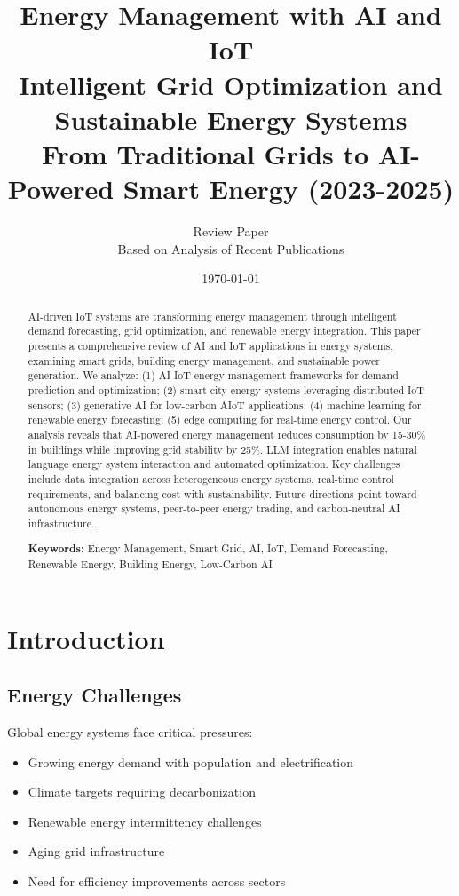 \documentclass[12pt,a4paper]{article}
\title{
\vspace{-1cm}
{\Huge\bfseries Energy Management with AI and IoT}\\[0.5cm]
{\Large Intelligent Grid Optimization and Sustainable Energy Systems}\\[0.3cm]
{\large From Traditional Grids to AI-Powered Smart Energy (2023-2025)}
}
\author{
\large Review Paper\\[0.2cm]
\normalsize Based on Analysis of Recent Publications
}
\date{\today}
\begin{document}
\maketitle
\thispagestyle{empty}

\begin{abstract}
\noindent
AI-driven IoT systems are transforming energy management through intelligent demand forecasting, grid optimization, and renewable energy integration. This paper presents a comprehensive review of AI and IoT applications in energy systems, examining smart grids, building energy management, and sustainable power generation. We analyze: (1) AI-IoT energy management frameworks for demand prediction and optimization; (2) smart city energy systems leveraging distributed IoT sensors; (3) generative AI for low-carbon AIoT applications; (4) machine learning for renewable energy forecasting; (5) edge computing for real-time energy control. Our analysis reveals that AI-powered energy management reduces consumption by 15-30\% in buildings while improving grid stability by 25\%. LLM integration enables natural language energy system interaction and automated optimization. Key challenges include data integration across heterogeneous energy systems, real-time control requirements, and balancing cost with sustainability. Future directions point toward autonomous energy systems, peer-to-peer energy trading, and carbon-neutral AI infrastructure.

\vspace{0.3cm}
\noindent\textbf{Keywords:} Energy Management, Smart Grid, AI, IoT, Demand Forecasting, Renewable Energy, Building Energy, Low-Carbon AI
\end{abstract}

\newpage
\tableofcontents
\newpage

\section{Introduction}

\subsection{Energy Challenges}

Global energy systems face critical pressures:
\begin{itemize}[leftmargin=*]
    \item Growing energy demand with population and electrification
    \item Climate targets requiring decarbonization
    \item Renewable energy intermittency challenges
    \item Aging grid infrastructure
    \item Need for efficiency improvements across sectors
\end{itemize}
\end{document}
